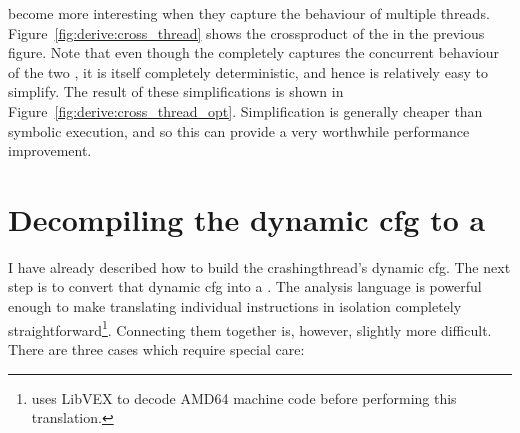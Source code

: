 {\STateMachines} become more interesting when they capture the
behaviour of multiple threads.  Figure~\ref{fig:derive:cross_thread}
shows the \gls{crossproduct} of the {\StateMachines} in the previous
figure.  Note that even though the {\StateMachine} completely captures
the concurrent behaviour of the two {\StateMachines}, it is itself
completely deterministic, and hence is relatively easy to simplify.
The result of these simplifications is shown in
Figure~\ref{fig:derive:cross_thread_opt}.  Simplification is generally
cheaper than symbolic execution, and so this can provide a very
worthwhile performance improvement.

\section[Decompiling the dynamic \glsentrytext{cfg} to a \StateMachine]{Decompiling the dynamic \gls{cfg} to a \StateMachine}
\label{sect:derive:compile_cfg}

I have already described how to build the \gls{crashingthread}'s
dynamic \gls{cfg}.  The next step is to convert that dynamic \gls{cfg}
into a {\StateMachine}.  The {\StateMachine} analysis language is
powerful enough to make translating individual instructions in
isolation completely straightforward\footnote{{\Implementation} uses
  LibVEX  to decode AMD64 machine code before performing
  this translation.}.  Connecting them together is, however, slightly
more difficult.  There are three cases which require special care:

